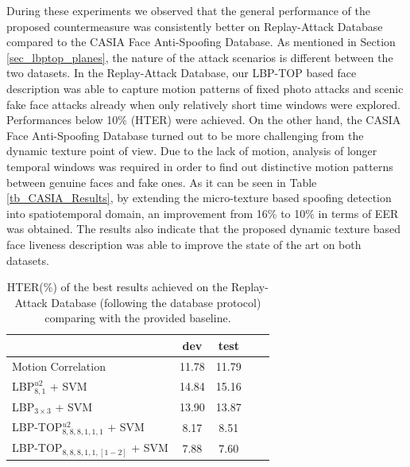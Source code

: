 During these experiments we observed that the general performance of the proposed countermeasure was consistently better on Replay-Attack Database compared to the CASIA Face Anti-Spoofing Database. As mentioned in Section \ref{sec_lbptop_planes}, the nature of the attack scenarios is different between the two datasets. In the Replay-Attack Database, our LBP-TOP based face description was able to capture motion patterns of fixed photo attacks and scenic fake face attacks already when only relatively short time windows were explored. Performances below 10\% (HTER) were achieved. On the other hand, the CASIA Face Anti-Spoofing Database turned out to be more challenging from the dynamic texture point of view. Due to the lack of motion, analysis of longer temporal windows was required in order to find out distinctive motion patterns between genuine faces and fake ones. As it can be seen in Table \ref{tb_CASIA_Results}, by extending the micro-texture based spoofing detection into spatiotemporal domain, an improvement from 16\% to 10\% in terms of EER was obtained. The results also indicate that the proposed dynamic texture based face liveness description was able to improve the state of the art on both datasets.


\begin{table}
   \caption{HTER(\%) of the best results achieved on the Replay-Attack Database (following the database protocol) comparing with the provided baseline.}
   \begin{center}

     \begin{tabular}{l | c c | c c |}
        \cline{2-3}
         & \textbf{dev} & \textbf{test} \\ \hline
         \multicolumn{1}{|l|}{Motion Correlation \cite{AnjosIJCB2011} } & 11.78 & 11.79  \\ \hline
         \multicolumn{1}{|l|}{LBP$_{8,1}^{u2}$ + SVM} & 14.84 & 15.16 \\ \hline
         \multicolumn{1}{|l|}{LBP$_{3\times3}$ + SVM~\cite{ChingovskaBIOSIG2012}} & 13.90 & 13.87 \\ \hline         
        \multicolumn{1}{|l|}{LBP-TOP$^{u2}_{8,8,8,1,1,1}$ + SVM} & 8.17 & 8.51  \\ \hline
        \multicolumn{1}{|l|}{LBP-TOP$_{8,8,8,1,1,[1-2]}$ + SVM} & 7.88 & 7.60  \\ \hline
     \end{tabular}
   \end{center}
   \label{tb_REPLAY_Results}
\end{table}


